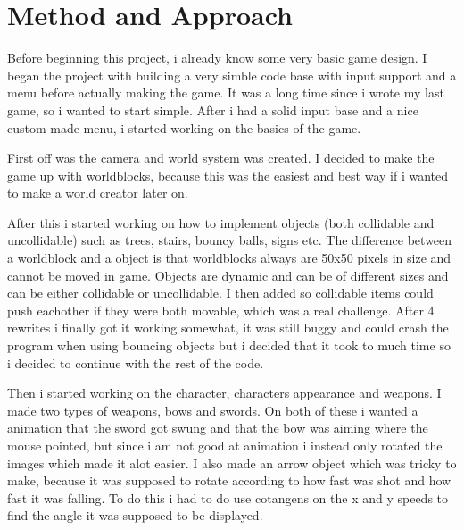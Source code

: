 \documentclass[a4paper,12pt]{article}
\begin{document}
\section{Method and Approach}

Before beginning this project, i already know some very basic game design.
I began the project with building a very simble code base with input support and a menu before actually making the game.
It was a long time since i wrote my last game, so i wanted to start simple.
After i had a solid input base and a nice custom made menu, i started working on the basics of the game.

First off was the camera and world system was created. 
I decided to make the game up with worldblocks, because this was the easiest and best way if i wanted to make a world creator later on.

After this i started working on how to implement objects (both collidable and uncollidable) such as trees, stairs, bouncy balls, signs etc.
The difference between a worldblock and a object is that worldblocks always are 50x50 pixels in size and cannot be moved in game.
Objects are dynamic and can be of different sizes and can be either collidable or uncollidable. 
I then added so collidable items could push eachother if they were both movable, which was a real challenge.
After 4 rewrites i finally got it working somewhat, it was still buggy and could crash the program when using bouncing objects but i decided that it took to much time so i decided to continue with the rest of the code.

Then i started working on the character, characters appearance and weapons.
I made two types of weapons, bows and swords.
On both of these i wanted a animation that the sword got swung and that the bow was aiming where the mouse pointed, but since i am not good at animation i instead only rotated the images which made it alot easier.
I also made an arrow object which was tricky to make, because it was supposed to rotate according to how fast was shot and how fast it was falling. 
To do this i had to do use cotangens on the x and y speeds to find the angle it was supposed to be displayed.
\end{document}
